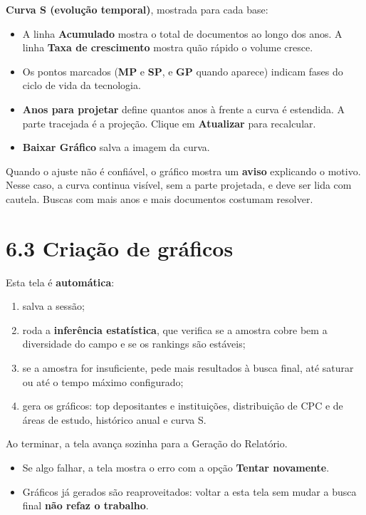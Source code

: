 \documentclass[
  brazilian,
  a4paper,12pt,oneside]{report}
\providecommand{\tightlist}{%
  \setlength{\itemsep}{0pt}\setlength{\parskip}{0pt}}
\begin{document}
\textbf{Curva S (evolução temporal)}, mostrada para cada base:

\begin{itemize}
\tightlist
\item
  A linha \textbf{Acumulado} mostra o total de documentos ao longo dos
  anos. A linha \textbf{Taxa de crescimento} mostra quão rápido o volume
  cresce.
\item
  Os pontos marcados (\textbf{MP} e \textbf{SP}, e \textbf{GP} quando
  aparece) indicam fases do ciclo de vida da tecnologia.
\item
  \textbf{Anos para projetar} define quantos anos à frente a curva é
  estendida. A parte tracejada é a projeção. Clique em
  \textbf{Atualizar} para recalcular.
\item
  \textbf{Baixar Gráfico} salva a imagem da curva.
\end{itemize}

Quando o ajuste não é confiável, o gráfico mostra um \textbf{aviso}
explicando o motivo. Nesse caso, a curva continua visível, sem a parte
projetada, e deve ser lida com cautela. Buscas com mais anos e mais
documentos costumam resolver.

\section{6.3 Criação de gráficos}\label{criauxe7uxe3o-de-gruxe1ficos}

Esta tela é \textbf{automática}:

\begin{enumerate}
\def\labelenumi{\arabic{enumi}.}
\tightlist
\item
  salva a sessão;
\item
  roda a \textbf{inferência estatística}, que verifica se a amostra
  cobre bem a diversidade do campo e se os rankings são estáveis;
\item
  se a amostra for insuficiente, pede mais resultados à busca final, até
  saturar ou até o tempo máximo configurado;
\item
  gera os gráficos: top depositantes e instituições, distribuição de CPC
  e de áreas de estudo, histórico anual e curva S.
\end{enumerate}

Ao terminar, a tela avança sozinha para a Geração do Relatório.

\begin{itemize}
\tightlist
\item
  Se algo falhar, a tela mostra o erro com a opção \textbf{Tentar
  novamente}.
\item
  Gráficos já gerados são reaproveitados: voltar a esta tela sem mudar a
  busca final \textbf{não refaz o trabalho}.
\end{itemize}
\end{document}
